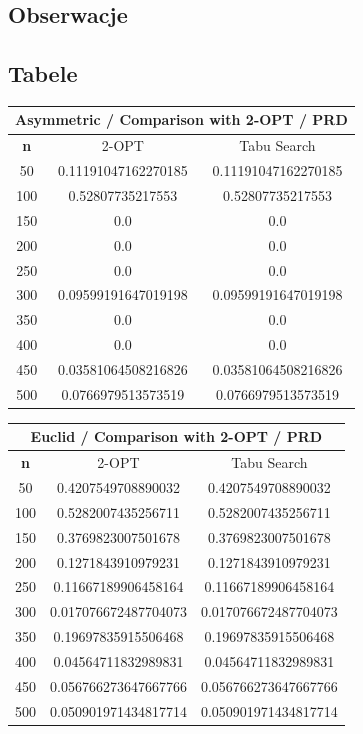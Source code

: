 \documentclass{article}
\begin{document}
\subsection{Obserwacje}


\subsection{Tabele}

\begin{center}
\begin{tabular}{|c|c|c|}
\hline
\multicolumn{3}{|c|}{\textbf{Asymmetric / Comparison with 2-OPT / PRD}}\\
\hline
\textbf{n} & 2-OPT & Tabu Search\\
\hline
50 & 0.11191047162270185 & 0.11191047162270185\\
\hline
100 & 0.52807735217553 & 0.52807735217553\\
\hline
150 & 0.0 & 0.0\\
\hline
200 & 0.0 & 0.0\\
\hline
250 & 0.0 & 0.0\\
\hline
300 & 0.09599191647019198 & 0.09599191647019198\\
\hline
350 & 0.0 & 0.0\\
\hline
400 & 0.0 & 0.0\\
\hline
450 & 0.03581064508216826 & 0.03581064508216826\\
\hline
500 & 0.0766979513573519 & 0.0766979513573519\\
\hline
\end{tabular}
\end{center}


\begin{center}
\begin{tabular}{|c|c|c|}
\hline
\multicolumn{3}{|c|}{\textbf{Euclid / Comparison with 2-OPT / PRD}}\\
\hline
\textbf{n} & 2-OPT & Tabu Search\\
\hline
50 & 0.4207549708890032 & 0.4207549708890032\\
\hline
100 & 0.5282007435256711 & 0.5282007435256711\\
\hline
150 & 0.3769823007501678 & 0.3769823007501678\\
\hline
200 & 0.1271843910979231 & 0.1271843910979231\\
\hline
250 & 0.11667189906458164 & 0.11667189906458164\\
\hline
300 & 0.017076672487704073 & 0.017076672487704073\\
\hline
350 & 0.19697835915506468 & 0.19697835915506468\\
\hline
400 & 0.04564711832989831 & 0.04564711832989831\\
\hline
450 & 0.056766273647667766 & 0.056766273647667766\\
\hline
500 & 0.050901971434817714 & 0.050901971434817714\\
\hline
\end{tabular}
\end{center}
\end{document}
